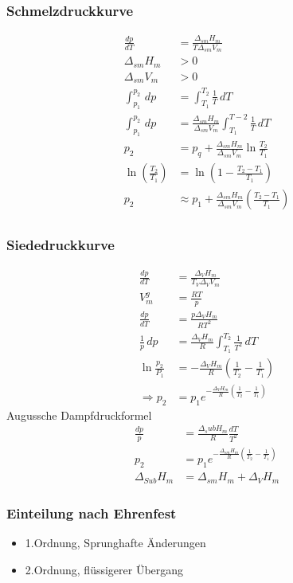 \documentclass[a4paper, fleqn]{article}
\begin{document}
\subsubsection{Schmelzdruckkurve}
\begin{align*}
    \frac{dp}{dT} &= \frac{\Delta_{sm} H_m}{T\Delta_{sm}V_m}\\
    \Delta_{sm} H_m &> 0\\
    \Delta_{sm}V_m &> 0\\
    \int_{p_1}^{p_2}\,dp &= \int_{T_1}^{T_2} \frac{1}{T}\,dT\\
    \int_{p_1}^{p_2}\,dp &= \frac{\Delta_{sm}H_m}{\Delta_{sm}V_m} \int_{T_1}^{T-2} \frac{1}{T}\,dT\\
    p_2 &= p_q + \frac{\Delta_{sm}H_m}{\Delta_{sm}V_m}\ln\frac{T_2}{T_1}\\
    \ln(\frac{T_2}{T_1}) &= \ln\left(1-\frac{T_2-T_1}{T_1}\right)\\
    p_2 &\approx p_1 + \frac{\Delta_{sm}H_m}{\Delta_{sm}V_m} \left(\frac{T_2-T_1}{T_1}\right)\\
\end{align*}

\subsubsection{Siededruckkurve}
\begin{align*}
    \frac{dp}{dT} &= \frac{\Delta_V H_m}{T_V\Delta_VV_m}\\
    V_m^g &= \frac{RT}{p}\\
    \frac{dp}{dT} &= \frac{p\Delta_VH_m}{RT^2}\\
    \frac{1}{p}\,dp &= \frac{\Delta_VH_m}{R}\int_{T_1}^{T_2} \frac{1}{T^2}\,dT\\
    \ln\frac{p_2}{P_1} &= -\frac{\Delta_VH_m}{R}\left(\frac{1}{T_2}-\frac{1}{T_1}\right)\\
    \Rightarrow p_2 &= p_1 e^{-\frac{\Delta_VH_m}{R}\left(\frac{1}{T_2}-\frac{1}{T_1}\right)}
\end{align*}
Augussche Dampfdruckformel\\
\begin{align*}
    \frac{dp}{p} &= \frac{\Delta_sub H_m}{R}\frac{dT}{T^2}\\
    p_2 &= p_1 e^{-\frac{\Delta_{sm}H_m}{R}\left(\frac{1}{T_2}-\frac{1}{T_1}\right)}\\
    \Delta_{Sub} H_m&=  \Delta_{sm}H_m+\Delta_VH_m
\end{align*}

\subsubsection{Einteilung nach Ehrenfest}
\begin{itemize}
    \item[] 1.Ordnung, Sprunghafte Änderungen\\
    \item[] 2.Ordnung, flüssigerer Übergang
\end{itemize}
\end{document}

